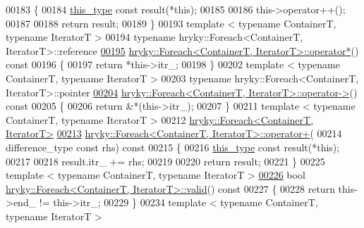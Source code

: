 \begin{DoxyCode}
00183 \{
00184     \hyperlink{classhryky_1_1_foreach}{this_type} \textcolor{keyword}{const} result(*\textcolor{keyword}{this});
00185 
00186     this->operator++();
00187     
00188     \textcolor{keywordflow}{return} result;
00189 \}
00193 \textcolor{keyword}{template} < \textcolor{keyword}{typename} ContainerT, \textcolor{keyword}{typename} IteratorT >
00194 \textcolor{keyword}{typename} hryky::Foreach<ContainerT, IteratorT>::reference 
\hypertarget{foreach_8h_source_l00195}{}\hyperlink{classhryky_1_1_foreach_a20deebc90d417dacd6052ffab3bf03e2}{00195} \hyperlink{classhryky_1_1_foreach}{hryky::Foreach<ContainerT, IteratorT>::operator*}()\textcolor{keyword}{ const}
00196 \textcolor{keyword}{}\{
00197     \textcolor{keywordflow}{return} *this->itr\_;
00198 \}
00202 \textcolor{keyword}{template} < \textcolor{keyword}{typename} ContainerT, \textcolor{keyword}{typename} IteratorT >
00203 \textcolor{keyword}{typename} hryky::Foreach<ContainerT, IteratorT>::pointer 
\hypertarget{foreach_8h_source_l00204}{}\hyperlink{classhryky_1_1_foreach_a14234edb35e385a4d5ced44f41571bf8}{00204} \hyperlink{classhryky_1_1_foreach}{hryky::Foreach<ContainerT, IteratorT>::operator->}()\textcolor{keyword}{ const}
00205 \textcolor{keyword}{}\{
00206     \textcolor{keywordflow}{return} &*(this->itr\_);
00207 \}
00211 \textcolor{keyword}{template} < \textcolor{keyword}{typename} ContainerT, \textcolor{keyword}{typename} IteratorT >
00212 \hyperlink{classhryky_1_1_foreach}{hryky::Foreach<ContainerT, IteratorT>} 
\hypertarget{foreach_8h_source_l00213}{}\hyperlink{classhryky_1_1_foreach_a7e92bdcb9a54fe6a1713e6e23fb3fa56}{00213} \hyperlink{classhryky_1_1_foreach}{hryky::Foreach<ContainerT, IteratorT>::operator+}(
00214     difference\_type \textcolor{keyword}{const} rhs)\textcolor{keyword}{ const}
00215 \textcolor{keyword}{}\{
00216     \hyperlink{classhryky_1_1_foreach}{this_type} \textcolor{keyword}{const} result(*\textcolor{keyword}{this});
00217 
00218     result.itr\_ += rhs;
00219     
00220     \textcolor{keywordflow}{return} result;
00221 \}
00225 \textcolor{keyword}{template} < \textcolor{keyword}{typename} ContainerT, \textcolor{keyword}{typename} IteratorT >
\hypertarget{foreach_8h_source_l00226}{}\hyperlink{classhryky_1_1_foreach_a45a07a1b312298448623a13c0e626d3a}{00226} \textcolor{keywordtype}{bool} \hyperlink{classhryky_1_1_foreach}{hryky::Foreach<ContainerT, IteratorT>::valid}()\textcolor{keyword}{ const}
00227 \textcolor{keyword}{}\{
00228     \textcolor{keywordflow}{return} this->end\_ != this->itr\_;
00229 \}
00234 \textcolor{keyword}{template} < \textcolor{keyword}{typename} ContainerT, \textcolor{keyword}{typename} IteratorT >

\end{DoxyCode}
